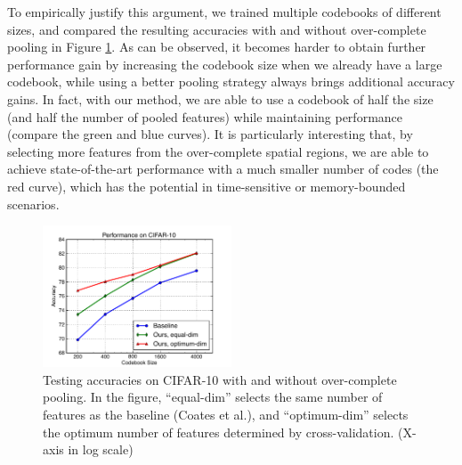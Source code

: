 To empirically justify this argument, we trained multiple codebooks of different sizes, and compared the resulting accuracies with and without over-complete pooling in Figure \ref{fig:ocpooling}. As can be observed, it becomes harder to obtain further performance gain by increasing the codebook size when we already have a large codebook, while using a better pooling strategy always brings additional accuracy gains. In fact, with our method, we are able to use a codebook of half the size (and half the number of pooled features) while maintaining performance (compare the green and blue curves). It is particularly interesting that, by selecting more features from the over-complete spatial regions, we are able to achieve state-of-the-art performance with a much smaller number of codes (the red curve), which has the potential in time-sensitive or memory-bounded scenarios.

\begin{figure}
  \centering
  \includegraphics[width=0.5\textwidth]{figs/smartpooling/perf_vs_codes.pdf}
  \caption{Testing accuracies on CIFAR-10 with and without over-complete pooling. In the figure, ``equal-dim'' selects the same number of features as the baseline (Coates et al.\cite{coates2010aistats}), and ``optimum-dim'' selects the optimum number of features determined by cross-validation. (X-axis in log scale)}
  \label{fig:ocpooling}
\end{figure}


